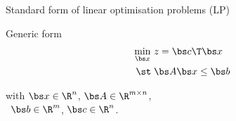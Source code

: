 \begin{frame}{Standard form of linear optimisation problems (LP)}
    \begin{alertblock}{Generic form}
        \vspace*{-1.5em}
        \begin{align*}
            \min_{\bs x}\ & z = \bs c\T \bs x \\
            \st\; & \bs A \bs x \leq \bs b
        \end{align*}

        \centering
        with $\bs x \in \R^n$, $\bs A \in \R^{m \times n}$,\\\, $\bs b \in \R^m$, $\bs c \in \R^n$.
        \vspace*{1ex}
    \end{alertblock}
\end{frame}


